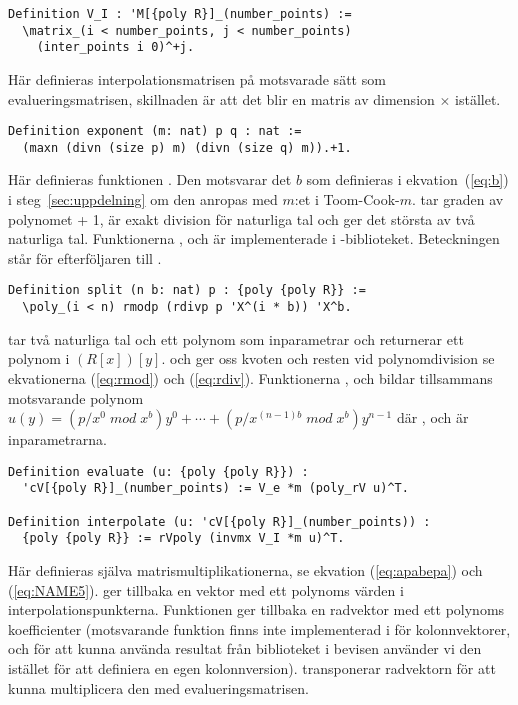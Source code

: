 \begin{lstlisting}
Definition V_I : 'M[{poly R}]_(number_points) :=
  \matrix_(i < number_points, j < number_points)
    (inter_points i 0)^+j.
\end{lstlisting}
Här definieras interpolationsmatrisen på motsvarade sätt som
evalueringsmatrisen, skillnaden är att det blir en matris av dimension
 $\times$  istället.

\begin{lstlisting}
Definition exponent (m: nat) p q : nat :=
  (maxn (divn (size p) m) (divn (size q) m)).+1.
\end{lstlisting}
Här definieras funktionen . Den motsvarar det $b$ som definieras i
ekvation~(\ref{eq:b}) i steg~\ref{sec:uppdelning} om den anropas med $m$:et i
Toom-Cook-$m$.  tar graden av polynomet  + 1,  är exakt
division för naturliga tal och  ger det största av två naturliga tal.
Funktionerna ,  och  är implementerade i
\ssr{}-biblioteket. Beteckningen  står för efterföljaren till .

\begin{lstlisting}
Definition split (n b: nat) p : {poly {poly R}} :=
  \poly_(i < n) rmodp (rdivp p 'X^(i * b)) 'X^b.
\end{lstlisting}
 tar två naturliga tal och ett polynom som inparametrar och returnerar
ett polynom i $(R[x])[y]$.  och  ger oss kvoten och resten
vid polynomdivision se ekvationerna (\ref{eq:rmod}) och (\ref{eq:rdiv}).
Funktionerna ,  och  bildar tillsammans
motsvarande polynom
$u(y)=(p/x^0\;mod\;x^b)y^0+\cdots+(p/x^{(n-1)b}\;mod\;x^b)y^{n-1}$ där ,
 och  är inparametrarna.

\begin{lstlisting}
Definition evaluate (u: {poly {poly R}}) :
  'cV[{poly R}]_(number_points) := V_e *m (poly_rV u)^T.

Definition interpolate (u: 'cV[{poly R}]_(number_points)) :
  {poly {poly R}} := rVpoly (invmx V_I *m u)^T.
\end{lstlisting}
Här definieras själva matrismultiplikationerna, se ekvation (\ref{eq:apabepa})
och (\ref{eq:NAME5}).  ger tillbaka en vektor med ett polynoms
värden i interpolationspunkterna. Funktionen  ger tillbaka en
radvektor med ett polynoms koefficienter (motsvarande funktion finns inte
implementerad i \ssr{} för kolonnvektorer, och för att kunna använda resultat
från biblioteket i bevisen använder vi den istället för att definiera en egen
kolonnversion).  transponerar radvektorn för att kunna multiplicera den med
evalueringsmatrisen.

